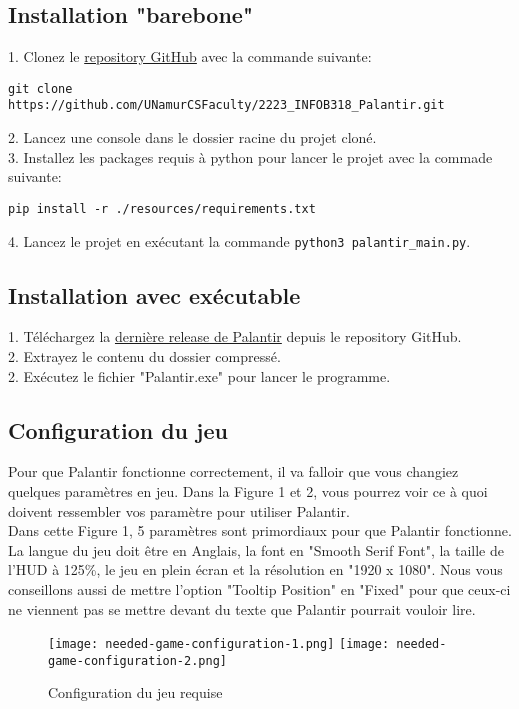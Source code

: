 \subsection{Installation "barebone"}
1. Clonez le \href{https://github.com/UNamurCSFaculty/2223_INFOB318_Palantir}{repository GitHub} avec la commande suivante:
\begin{verbatim}
git clone https://github.com/UNamurCSFaculty/2223_INFOB318_Palantir.git
\end{verbatim}
2. Lancez une console dans le dossier racine du projet cloné.\\
3. Installez les packages requis à python pour lancer le projet avec la commade suivante:
\begin{verbatim}
pip install -r ./resources/requirements.txt
\end{verbatim}
4. Lancez le projet en exécutant la commande {\renewcommand{\fcolorbox}[4][]{#4}\texttt{python3 palantir_main.py}}.

\subsection{Installation avec exécutable}
1. Téléchargez la \href{https://github.com/UNamurCSFaculty/2223_INFOB318_Palantir/releases}{dernière release de Palantir} depuis le repository GitHub.\\
2. Extrayez le contenu du dossier compressé.\\
2. Exécutez le fichier "Palantir.exe" pour lancer le programme.

\subsection{Configuration du jeu}
Pour que Palantir fonctionne correctement, il va falloir que vous changiez quelques paramètres en jeu. Dans la Figure 1 et 2, vous pourrez voir ce à quoi doivent ressembler vos paramètre pour utiliser Palantir.\\

Dans cette Figure 1, 5 paramètres sont primordiaux pour que Palantir fonctionne. La langue du jeu doit être en Anglais, la font en "Smooth Serif Font", la taille de l'HUD à 125\%, le jeu en plein écran et la résolution en "1920 x 1080". Nous vous conseillons aussi de mettre l'option "Tooltip Position" en "Fixed" pour que ceux-ci ne viennent pas se mettre devant du texte que Palantir pourrait vouloir lire.
\begin{figure}[ht!]
    \begin{center}
        \texttt{[image: needed-game-configuration-1.png]}
        \texttt{[image: needed-game-configuration-2.png]}
    \end{center}
    \caption{Configuration du jeu requise}
\end{figure}